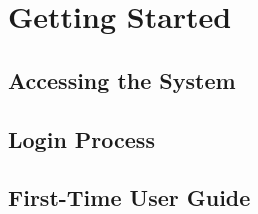 \newpage
\section{Getting Started}


\subsection{Accessing the System}


\subsection{Login Process}




\subsection{First-Time User Guide}